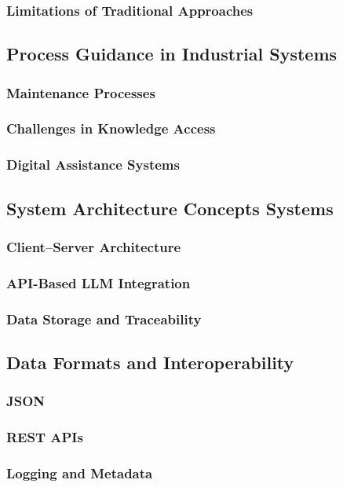 \subsubsection{Limitations of Traditional Approaches\label{sec:Limitations of Traditional Approaches}}


\subsection{Process Guidance in Industrial Systems \label{sec:Process Guidance in Industrial Systems}}

\subsubsection{Maintenance Processes \label{sec:Maintenance Processes}}

\subsubsection{Challenges in Knowledge Access \label{sec:Challenges in Knowledge Access}}

\subsubsection{Digital Assistance Systems \label{sec:Digital Assistance Systems}}


\subsection{System Architecture Concepts Systems \label{sec:System Architecture Concepts}}

\subsubsection{Client–Server Architecture \label{sec:Client–Server Architecture}}

\subsubsection{API-Based LLM Integration \label{sec:API-Based LLM Integration}}

\subsubsection{Data Storage and Traceability \label{sec:Data Storage and Traceability}}

\subsection{Data Formats and Interoperability \label{sec:Data Formats and Interoperability}}

\subsubsection{JSON \label{sec:JSON}}

\subsubsection{REST APIs\label{sec:AREST APIs}}

\subsubsection{Logging and Metadata \label{sec:Logging and Metadata}}

